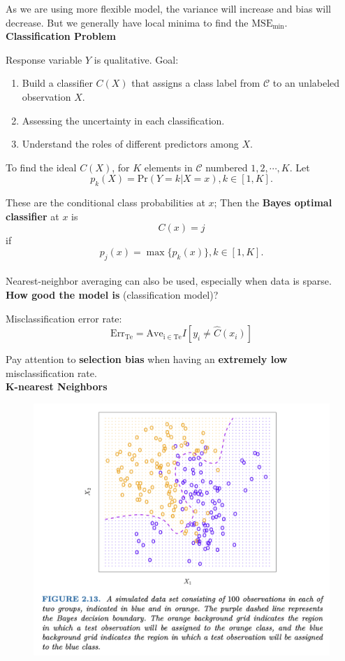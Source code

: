 \documentclass{article}
\begin{document}
As we are using more flexible model, the variance will increase and bias will decrease. But we generally have local minima to find the $\mathrm{MSE_{\min}}$.\\

\noindent \textbf{Classification Problem}

Response variable $Y$ is qualitative. Goal:
\begin{enumerate}
    \item Build a classifier $C(X)$ that assigns a class label from $\mathcal{C}$ to an unlabeled observation $X$.
    \item Assessing the uncertainty in each classification.
    \item Understand the roles of different predictors among $X$.
\end{enumerate}

To find the ideal $C(X)$, for $K$ elements in $\mathcal{C}$ numbered $1, 2, \cdots, K$. Let $$p_k(X) = \mathrm{Pr}(Y=k \vert X = x), k \in [1,K].$$

These are the conditional class probabilities at $x$; Then the \textbf{Bayes optimal classifier} at $x$ is $$C(x) = j$$  if $$p_j(x) = \max\{p_k(x)\}, k \in [1,K].$$\\

Nearest-neighbor averaging can also be used, especially when data is sparse.\\

\noindent \textbf{How good the model is} (classification model)?

Misclassification error rate: $$\mathrm{Err_{Te}} = \mathrm{Ave_{i \in Te}}I[y_i \neq \hat{C}(x_i)]$$

Pay attention to \textbf{selection bias} when having an \textbf{extremely low} misclassification rate.\\

\noindent \textbf{K-nearest Neighbors}
\begin{figure}[h!]
    \centering
    \includegraphics[width=0.60\linewidth]{KNN.png}
    \label{fig:KNN}
\end{figure}
\end{document}
